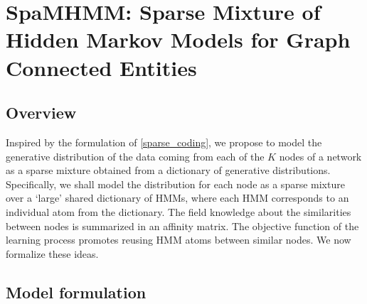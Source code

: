\section{SpaMHMM: Sparse Mixture of Hidden Markov Models for Graph Connected Entities}
\label{sec:spamhmm}

\subsection{Overview}

Inspired by the formulation of \eqref{sparse_coding}, we propose to model the generative distribution of the data coming from each of the $K$ nodes of a network as a sparse mixture obtained from a dictionary of generative distributions. Specifically, we shall model the distribution for each node as a sparse mixture over a `large' shared dictionary of HMMs, where each HMM corresponds to an individual atom from the dictionary.
The field knowledge about the similarities between nodes is summarized in an affinity matrix. The objective function of the learning process promotes reusing HMM atoms between similar nodes.
We now formalize these ideas.

\subsection{Model formulation}
